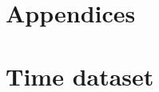 \documentclass[
    12pt, %
]{fphw}
\begin{document}
\newpage

\begin{appendices}

\section*{Appendices}

\section{Time dataset}



\end{appendices}

\end{document}
